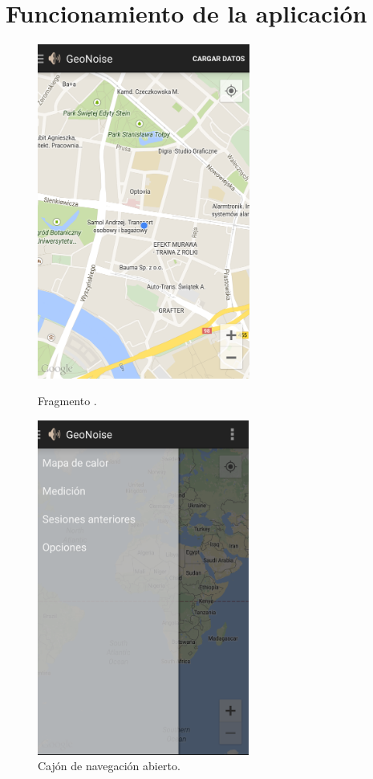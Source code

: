 \label{chp:App}
\section{Funcionamiento de la aplicación}
\begin{figure}[h] \centering
 \begin{minipage}{0.45\textwidth}\centering
    \includegraphics[height=11cm]{graphs/screen_location.png} \caption{Fragmento . }\label{fig:screen:location}
\end{minipage}
\hfill
 \begin{minipage}{0.45\textwidth}\centering
    \includegraphics[height=11cm]{graphs/navdrawer.png} \caption{Cajón de navegación abierto.}\label{fig:screen:navdrawer}
\end{minipage}
\end{figure}

